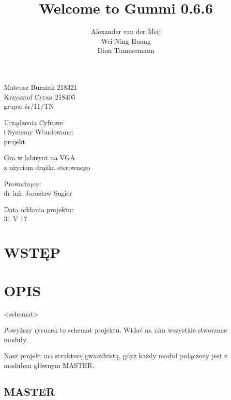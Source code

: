 \documentclass[11pt]{article}
\title{\textbf{Welcome to Gummi 0.6.6}}
\author{Alexander van der Meij\\
		Wei-Ning Huang\\
		Dion Timmermann}
\date{}
\begin{document}
\thispagestyle{empty}

\noindent
Mateusz Burniak 218321 \\
Krzysztof Cyran 218405 \\
grupa: śr/11/TN

\vfill

\begin{center}
  \begin{Huge}
    Urządzenia Cyfrowe \\
    i Systemy Wbudowane: \\
    \vspace{.5cm}
    projekt
  \end{Huge}
  
  \vspace{3cm}
  
  \begin{Large}
    Gra w labirynt na VGA \\
    z użyciem drążka sterownego
  \end{Large}
  
  \vspace{3cm}
  
  \begin{Large}
    Prowadzący: \\
    dr inż. Jarosław Sugier
  \end{Large}
  
  \vspace{3cm}
  
  Data oddania projektu: \\
  31 V 17
  
\end{center}

\vfill

\newpage

\section{WSTĘP}

\section{OPIS}

<schemat>

Powyższy rysunek to schemat projektu.
Widać na nim wszystkie stworzone moduły.

Nasz projekt ma strukturę gwiazdzistą, gdyż każdy moduł połączony jest z modułem głównym MASTER.

\subsection{MASTER}
\end{document}
